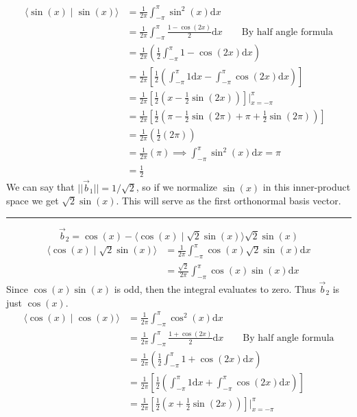 \documentclass{report}
\begin{document}
\begin{align}
\langle \sin(x) \mid \sin(x) \rangle &= \frac{1}{2\pi}\int_{-\pi}^{\pi} \sin^2(x)\mathrm{d}x\nonumber\\
&=\frac{1}{2\pi}\int_{-\pi}^{\pi} \frac{1-\cos(2x)}{2}\mathrm{d}x\qquad\text{By half angle formula}\nonumber\\
&=\frac{1}{2\pi}\left(\frac{1}{2}\int_{-\pi}^\pi1-\cos(2x)\mathrm{d}x\right)\nonumber\\
&=\frac{1}{2\pi}\left[\frac{1}{2}\left(\int_{-\pi}^\pi1\mathrm{d}x-\int_{-\pi}^\pi\cos(2x)\mathrm{d}x\right)\right]\nonumber\\
&=\frac{1}{2\pi}\left[\frac{1}{2}\left(x-\frac{1}{2}\sin(2x)\right)\right]\biggr\rvert_{x=-\pi}^\pi\nonumber\\
&=\frac{1}{2\pi}\left[\frac{1}{2}\left(\pi-\frac{1}{2}\sin(2\pi)+\pi+\frac{1}{2}\sin(2\pi)\right)\right]\nonumber\\
&=\frac{1}{2\pi}\left(\frac{1}{2}\left(2\pi\right)\right)\nonumber\\
&=\frac{1}{2\pi}\left(\pi\right)\implies\int_{-\pi}^\pi\sin^2(x)\mathrm{d}x = \pi\\
&=\frac{1}{2}\nonumber
\end{align}
We can say that $||\vec{b}_1|| = 1/\sqrt{2}$, so if we normalize $\sin(x)$ in this inner-product space we get $\sqrt{2}\sin(x)$. This will serve as the first orthonormal basis vector.
\vspace{1em}
\hrule
\vspace{1em}
$$
\vec{b}_2 = \cos(x)-\langle \cos(x) \mid \sqrt{2}\sin(x) \rangle \sqrt{2}\sin(x)
$$
\begin{align}
\langle \cos(x) \mid \sqrt{2}\sin(x) \rangle &= \frac{1}{2\pi} \int_{-\pi}^\pi \cos(x)\sqrt{2}\sin(x)\mathrm{d}x\nonumber\\
&=\frac{\sqrt{2}}{2\pi}\int_{-\pi}^\pi \cos(x)\sin(x)\mathrm{d}x\nonumber
\end{align}
Since $\cos(x)\sin(x)$ is odd, then the integral evaluates to zero. Thus $\vec{b}_2$ is just $\cos(x)$.
\begin{align}
\langle \cos(x) \mid \cos(x) \rangle &= \frac{1}{2\pi}\int_{-\pi}^\pi \cos^2(x)\mathrm{d}x\nonumber\\
&=\frac{1}{2\pi}\int_{-\pi}^{\pi} \frac{1+\cos(2x)}{2}\mathrm{d}x\qquad\text{By half angle formula}\nonumber\\
&=\frac{1}{2\pi}\left(\frac{1}{2}\int_{-\pi}^\pi1+\cos(2x)\mathrm{d}x\right)\nonumber\\
&=\frac{1}{2\pi}\left[\frac{1}{2}\left(\int_{-\pi}^\pi1\mathrm{d}x+\int_{-\pi}^\pi\cos(2x)\mathrm{d}x\right)\right]\nonumber\\
&=\frac{1}{2\pi}\left[\frac{1}{2}\left(x+\frac{1}{2}\sin(2x)\right)\right]\biggr\rvert_{x=-\pi}^\pi\nonumber
\end{align}
\end{document}

